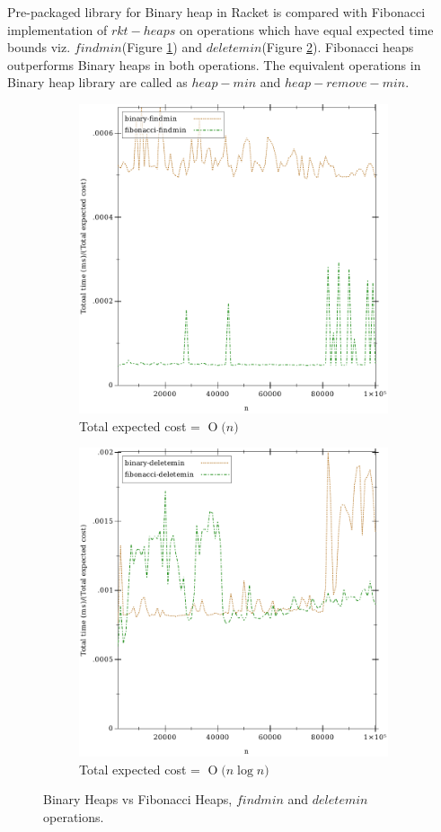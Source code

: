 \documentclass{llncs}
\newcommand{\BigO}[1]{\ensuremath{\operatorname{O}\bigl(#1\bigr)}}
\begin{document}
Pre-packaged library for Binary heap in Racket is compared with Fibonacci implementation of $rkt-heaps$ on operations which have equal expected time bounds viz. $findmin$(Figure \ref{fig:findmin}) and $deletemin$(Figure \ref{fig:deletemin}). Fibonacci heaps outperforms Binary heaps in both operations. The equivalent operations in Binary heap library are called as $heap-min$ and $heap-remove-min$.

\begin{figure}
	\begin{subfigure}{0.5\textwidth}
		\centering
		\includegraphics[width=0.8\linewidth]{FIG/findmin.pdf}
		\caption{Total expected cost = \BigO{n}}
		\label{fig:findmin}
	\end{subfigure}%
	\begin{subfigure}{0.5\textwidth}
		\centering
		\includegraphics[width=0.8\linewidth]{FIG/deletemin.pdf}
		\caption{Total expected cost = \BigO{n \log n}}
		\label{fig:deletemin}
	\end{subfigure}
	\caption{Binary Heaps vs Fibonacci Heaps, $findmin$ and $deletemin$ operations.}
	\label{fig:fi_bi_comp}
\end{figure}
\end{document}
